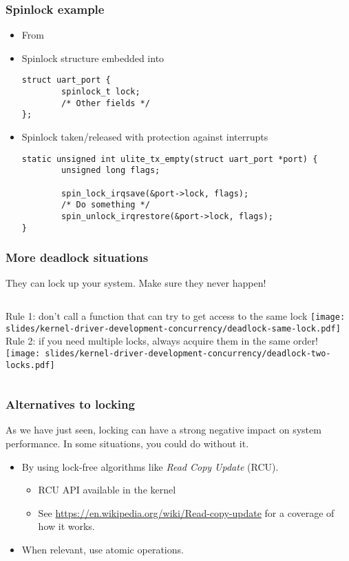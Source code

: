 \begin{frame}[fragile]
  \frametitle{Spinlock example}
  \begin{itemize}
  \item From 
  \item Spinlock structure embedded into 
    \begin{block}{}
    \begin{verbatim}
struct uart_port {
        spinlock_t lock;
        /* Other fields */
};
    \end{verbatim}
    \end{block}
  \item Spinlock taken/released with protection against interrupts
    \begin{block}{}
    \begin{verbatim}
static unsigned int ulite_tx_empty(struct uart_port *port) {
        unsigned long flags;

        spin_lock_irqsave(&port->lock, flags);
        /* Do something */
        spin_unlock_irqrestore(&port->lock, flags);
}
    \end{verbatim}
    \end{block}
  \end{itemize}
\end{frame}

\begin{frame}
  \frametitle{More deadlock situations} They can lock up your system. Make sure they never happen!
  \vspace{0.5cm}
  \begin{columns}
      Rule 1: don't call a function that can try to get access to the same lock
      \texttt{[image: slides/kernel-driver-development-concurrency/deadlock-same-lock.pdf]}
      Rule 2: if you need multiple locks, always acquire them in the same order!
      \texttt{[image: slides/kernel-driver-development-concurrency/deadlock-two-locks.pdf]}
  \end{columns}
\end{frame}



\begin{frame}
  \frametitle{Alternatives to locking}
  As we have just seen, locking can have a strong negative
  impact on system performance. In some situations, you could do
  without it.
  \begin{itemize}
  \item By using lock-free algorithms like \emph{Read Copy Update}
    (RCU).
    \begin{itemize}
    \item RCU API available in the kernel
    \item See \url{https://en.wikipedia.org/wiki/Read-copy-update} for a
      coverage of how it works.
    \end{itemize}
  \item When relevant, use atomic operations.
  \end{itemize}
\end{frame}


